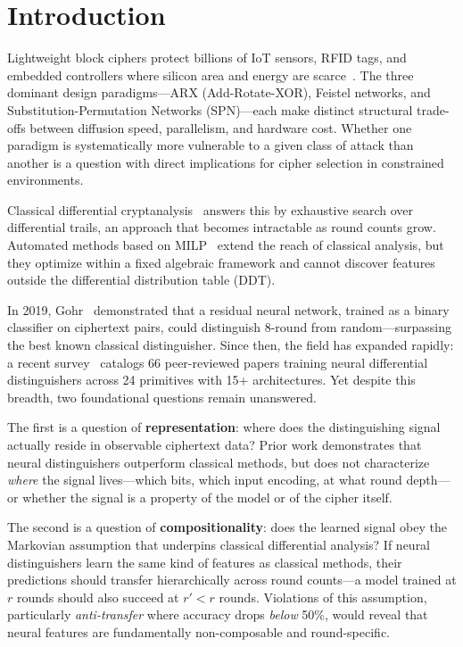 \section{Introduction}
\label{sec:intro}

Lightweight block ciphers protect billions of IoT sensors, RFID tags, and embedded controllers where silicon area and energy are scarce~\citep{bogdanov2007present,beaulieu2015simon}.
The three dominant design paradigms---ARX (Add-Rotate-XOR), Feistel networks, and Substitution-Permutation Networks (SPN)---each make distinct structural trade-offs between diffusion speed, parallelism, and hardware cost.
Whether one paradigm is systematically more vulnerable to a given class of attack than another is a question with direct implications for cipher selection in constrained environments.

Classical differential cryptanalysis~\citep{biham1991differential} answers this by exhaustive search over differential trails, an approach that becomes intractable as round counts grow.
Automated methods based on MILP~\citep{mouha2012milp} extend the reach of classical analysis, but they optimize within a fixed algebraic framework and cannot discover features outside the differential distribution table (DDT).

In 2019, Gohr~\citep{gohr2019} demonstrated that a residual neural network, trained as a binary classifier on ciphertext pairs, could distinguish 8-round \speck from random---surpassing the best known classical distinguisher.
Since then, the field has expanded rapidly: a recent survey~\citep{gerault2024sok} catalogs 66 peer-reviewed papers training neural differential distinguishers across 24 primitives with 15+ architectures.
Yet despite this breadth, two foundational questions remain unanswered.

The first is a question of \textbf{representation}: where does the distinguishing signal actually reside in observable ciphertext data?
Prior work demonstrates that neural distinguishers outperform classical methods, but does not characterize \emph{where} the signal lives---which bits, which input encoding, at what round depth---or whether the signal is a property of the model or of the cipher itself.

The second is a question of \textbf{compositionality}: does the learned signal obey the Markovian assumption that underpins classical differential analysis?
If neural distinguishers learn the same kind of features as classical methods, their predictions should transfer hierarchically across round counts---a model trained at $r$ rounds should also succeed at $r' < r$ rounds.
Violations of this assumption, particularly \emph{anti-transfer} where accuracy drops \emph{below} 50\%, would reveal that neural features are fundamentally non-composable and round-specific.

